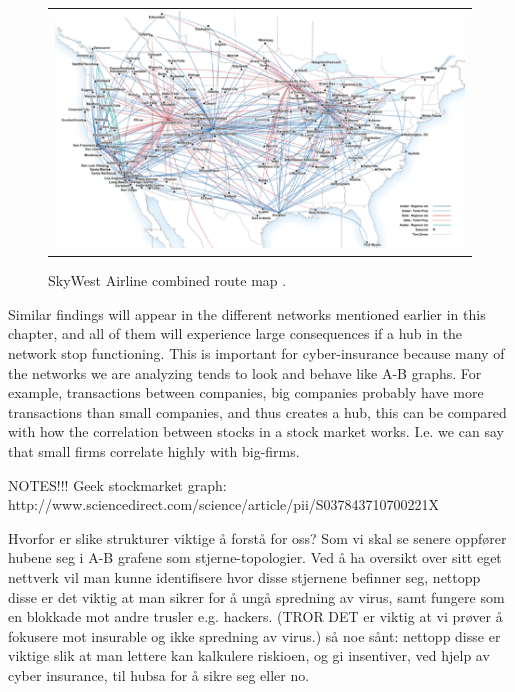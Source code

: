 \begin{figure}[h]
\centering
\begin{tabular}{@{}c@{}}
\includegraphics[width=1.0\textwidth]{../Figures/airlineRoutesUSA.png}
\end{tabular}
\caption[Caption for LOF]{SkyWest Airline combined route map \cite{airlineRoutes}.
\label{fig:airlineRouteMap}}
\end{figure}

Similar findings will appear in the different networks mentioned earlier in this chapter, and all of them will experience large consequences if a hub in the network stop functioning. This is important for cyber-insurance because many of the networks we are analyzing tends to look and behave like A-B graphs. For example, transactions between companies, big companies probably have more transactions than small companies, and thus creates a hub, this can be compared with how the correlation between stocks in a stock market works. I.e. we can say that small firms correlate highly with big-firms. 



NOTES!!!
Geek stockmarket graph: http://www.sciencedirect.com/science/article/pii/S037843710700221X



Hvorfor er slike strukturer viktige å forstå for oss? 
Som vi skal se senere oppfører hubene seg i A-B grafene som stjerne-topologier. 
Ved å ha oversikt over sitt eget nettverk vil man kunne identifisere hvor disse stjernene befinner seg, nettopp disse er det viktig at man sikrer for å ungå spredning av virus, samt fungere som en blokkade mot andre trusler e.g. hackers. (TROR DET er viktig at vi prøver å fokusere mot insurable og ikke spredning av virus.)
så noe sånt:
nettopp disse er viktige slik at man lettere kan kalkulere riskioen, og gi insentiver, ved hjelp av cyber insurance, til hubsa for å sikre seg eller no.








